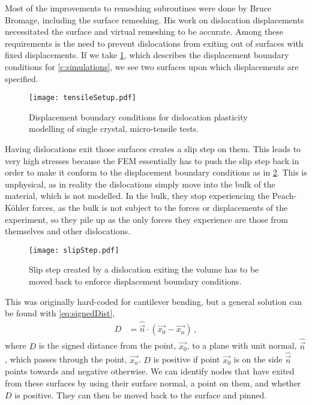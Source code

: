 Most of the improvements to remeshing subroutines were done by Bruce Bromage, including the surface remeshing. His work on dislocation displacements necessitated the surface and virtual remeshing to be accurate. Among these requirements is the need to prevent dislocations from exiting out of surfaces with fixed displacements. If we take \cref{f:tensileSetupTop}, which describes the displacement boundary conditions for \cref{c:simulations}, we see two surfaces upon which displacements are specified.
\begin{figure}
    \centering
    \texttt{[image: tensileSetup.pdf]}
    \caption[Displacement boundary conditions for dislocation plasticity modelling of single crystal, micro-tensile tests.]{Displacement boundary conditions for dislocation plasticity modelling of single crystal, micro-tensile tests.}
    \label{f:tensileSetupTop}
\end{figure}
Having dislocations exit those surfaces creates a slip step on them. This leads to very high stresses because the FEM essentially has to push the slip step back in order to make it conform to the displacement boundary conditions as in \cref{f:slipStep}. This is unphysical, as in reality the dislocations simply move into the bulk of the material, which is not modelled. In the bulk, they stop experiencing the Peach-K\"{o}hler forces, as the bulk is not subject to the forces or displacements of the experiment, so they pile up as the only forces they experience are those from themselves and other dislocations.
\begin{figure}
    \centering
    \texttt{[image: slipStep.pdf]}
    \caption{Slip step created by a dislocation exiting the volume has to be moved back to enforce displacement boundary conditions.}
    \label{f:slipStep}
\end{figure}

This was originally hard-coded for cantilever bending, but a general solution can be found with \cref{eq:signedDist},
\begin{align}\label{eq:signedDist}
    D & = \hat{\vec{n}} \cdot (\vec{x_0} - \vec{x_n})\,,
\end{align}
where $D$ is the signed distance from the point, $\vec{x_0}$, to a plane with unit normal, $\hat{\vec{n}}$, which passes through the point, $\vec{x_n}$. $D$ is positive if point $\vec{x_0}$ is on the side $\hat{\vec{n}}$ points towards and negative otherwise. We can identify nodes that have exited from these surfaces by using their surface normal, a point on them, and whether $D$ is positive. They can then be moved back to the surface and pinned.

